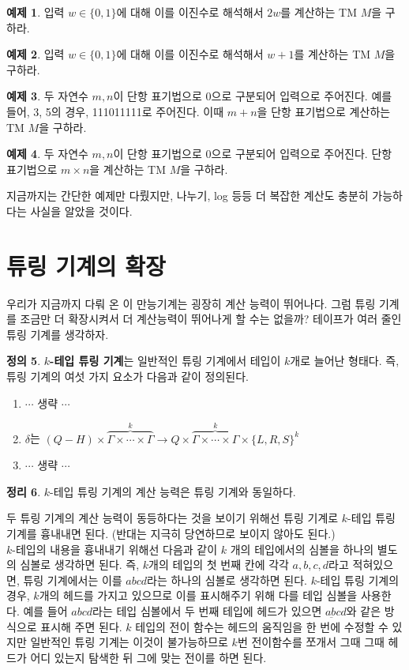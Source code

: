 \documentclass[b5paper, 10pt]{book}
\theoremstyle{definition}
\newtheorem{defn}{정의}[chapter]
\newtheorem{thm}[defn]{정리}
\newtheorem{ex}[defn]{예제}
\newenvironment{pf*}{\pushQED{\qed}\pf}{\popQED\endpf}
\begin{document}
\begin{ex}
    입력 $w \in \{0,1\}$에 대해 이를 이진수로 해석해서 $2w$를 계산하는 
    TM $M$을 구하라. 
\end{ex}
\begin{ex}
    입력 $w \in \{0,1\}$에 대해 이를 이진수로 해석해서 $w + 1$를 계산하는 
    TM $M$을 구하라. 
\end{ex}
\begin{ex}
    두 자연수 $m, n$이 단항 표기법으로 0으로 구분되어 입력으로 주어진다.
    예를 들어, 3, 5의 경우, 111011111로 주어진다. 이때 $m+n$을
    단항 표기법으로 계산하는 TM $M$을 구하라. 
\end{ex}
\begin{ex}
    두 자연수 $m,n$이 단항 표기법으로 0으로 구분되어 입력으로 주어진다.
    단항 표기법으로 $m \times n$을 계산하는 TM $M$을 구하라. 
\end{ex}
지금까지는 간단한 예제만 다뤘지만, 나누기, log 등등 더 복잡한 계산도 
충분히 가능하다는 사실을 알았을 것이다.
\section{튜링 기계의 확장}
우리가 지금까지 다뤄 온 이 만능기계는 굉장히 계산 능력이 뛰어나다. 그럼 튜링 기계를 조금만
더 확장시켜서 더 계산능력이 뛰어나게 할 수는 없을까? 테이프가 여러 줄인 튜링 기계를 생각하자.
\begin{defn}
\textbf{$k$-테입 튜링 기계}는 일반적인 튜링 기계에서 테입이 $k$개로 늘어난 형태다. 즉, 튜링 기계의 
여섯 가지 요소가 다음과 같이 정의된다.
\begin{enumerate}
    \item $\cdots$ 생략 $\cdots$
    \item $\delta$는 $(Q-H) \times \overbrace{\Gamma \times \cdots \times \Gamma}^k \rightarrow 
    Q \times \overbrace{\Gamma \times \cdots \times \Gamma}^k \times \{L, R, S\}^k $ 
    \item $\cdots$ 생략 $\cdots$
\end{enumerate}
\end{defn}
\begin{thm}
    $k$-테입 튜링 기계의 계산 능력은 튜링 기계와 동일하다. 
\end{thm}
\begin{pf*}
    두 튜링 기계의 계산 능력이 동등하다는 것을 보이기 위해선 튜링 기계로 $k$-테입 튜링 기계를 
    흉내내면 된다. (반대는 지극히 당연하므로 보이지 않아도 된다.) \\ 
    $k$-테입의 내용을 흉내내기 위해선 다음과 같이 $k$ 개의 테입에서의 심볼을 하나의 별도의 심볼로
    생각하면 된다. 즉, $k$개의 테입의 첫 번째 칸에 각각 $a,b,c,d$라고 적혀있으면, 튜링 기계에서는 
    이를 $abcd$라는 하나의 심볼로 생각하면 된다. $k$-테입 튜링 기계의 경우, $k$개의 헤드를 가지고
    있으므로 이를 표시해주기 위해 다를 테입 심볼을 사용한다. 예를 들어 $abcd$라는 테입 심볼에서
    두 번째 테입에 헤드가 있으면 $a\underbar{b}cd$와 같은 방식으로 표시해 주면 된다. 
    $k$ 테입의 전이 함수는 헤드의 움직임을 한 번에 수정할 수 있지만  
    일반적인 튜링 기계는 이것이 불가능하므로 $k$번 전이함수를 쪼개서 그때 그때 헤드가
    어디 있는지 탐색한 뒤 그에 맞는 전이를 하면 된다. 
\end{pf*}
\end{document}
